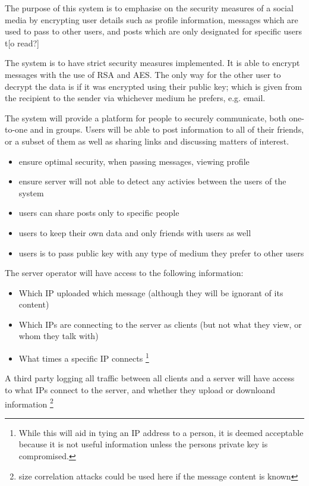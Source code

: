 The purpose of this system is to emphasise on the security measures of a social
media by encrypting user details such as profile information, messages which are
used to pass to other users, and posts which are only designated for specific
users t[o read?]

The system is to have strict security measures implemented. It is able to
encrypt messages with the use of RSA and AES. The only way for the other user to
decrypt the data is if it was encrypted using their public key; which is given
from the recipient to the sender via whichever medium he prefers, e.g. email.

The system will provide a platform for people to securely communicate, both
one-to-one and in groups. Users will be able to post information to all of their
friends, or a subset of them as well as sharing links and discussing matters of
interest.

\begin{itemize}
\item ensure optimal security, when passing messages, viewing profile
\item ensure server will not able to detect any activies between the users of
      the system
\item users can share posts only to specific people
\item users to keep their own data and only friends with users as well
\item users is to pass public key with any type of medium they prefer to other
      users
\end{itemize}

The server operator will have access to the following information:
\begin{itemize}
\item Which IP uploaded which message (although they will be ignorant of its
content)
\item Which IPs are connecting to the server as clients (but not what they view,
      or whom they talk with)
\item What times a specific IP connects \footnote {While this will aid in tying
an IP address to a person, it is deemed acceptable because it is not useful
information unless the persons private key is compromised.}
\end{itemize}

A third party logging all traffic between all clients and a server will have
access to  what IPs connect to the
server, and whether they upload or downloand information \footnote{size
correlation attacks could be used here if the message content is known}

